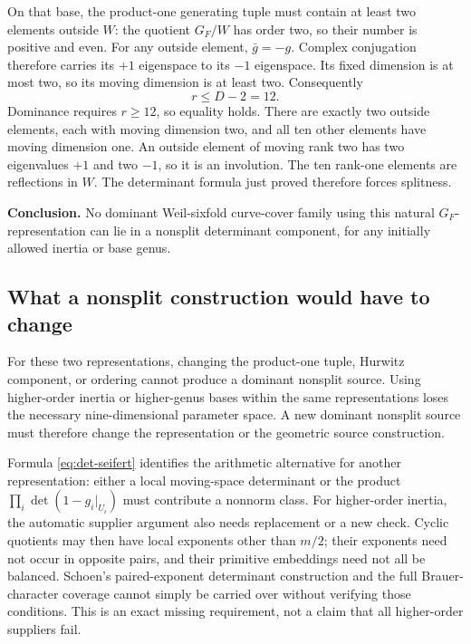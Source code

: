 On that base, the product-one generating tuple must contain at least
two elements outside \(W\): the quotient \(G_F/W\) has order two,
so their number is positive and even.  For any outside element,
\(\bar g=-g\).  Complex conjugation therefore carries its \(+1\)
eigenspace to its \(-1\) eigenspace.  Its fixed dimension is at most
two, so its moving dimension is at least two.  Consequently
\[
                 r\le D-2=12.
\]
Dominance requires \(r\ge12\), so equality holds.  There are exactly
two outside elements, each with moving dimension two, and all ten other
elements have moving dimension one.  An outside element of moving rank
two has two eigenvalues \(+1\) and two \(-1\), so it is an involution.
The ten rank-one elements are reflections in \(W\).  The determinant
formula just proved therefore forces splitness.

\textbf{Conclusion.} No dominant Weil-sixfold curve-cover family using
this natural \(G_F\)-representation can lie in a nonsplit determinant
component, for any initially allowed inertia or base genus.

\subsection*{What a nonsplit construction would have to change}

For these two representations, changing the product-one tuple, Hurwitz
component, or ordering cannot produce a dominant nonsplit source.  Using
higher-order inertia or higher-genus bases within the same representations
loses the necessary nine-dimensional parameter space.  A new dominant
nonsplit source must therefore change the representation or the geometric
source construction.

Formula \eqref{eq:det-seifert} identifies the arithmetic alternative for
another representation: either a local moving-space determinant or the
product \(\prod_i\det(1-g_i|_{U_i})\) must contribute a nonnorm class.
For higher-order inertia, the automatic supplier argument also needs
replacement or a new check.  Cyclic quotients may then have local
exponents other than \(m/2\); their exponents need not occur in opposite
pairs, and their primitive embeddings need not all be balanced.  Schoen's
paired-exponent determinant construction and the full Brauer-character
coverage cannot simply be carried over without verifying those conditions.
This is an exact missing requirement, not a claim that all higher-order
suppliers fail.
